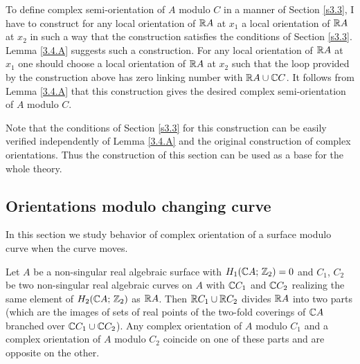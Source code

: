 \documentclass{article}
\numberwithin{equation}{section}
\begin{document}
To define complex semi-orientation of $A$ modulo $C$ in a manner of
Section \ref{s3.3}, I have to construct for any local orientation of $\mathbb R A$ at
$x_1$ a local orientation of $\mathbb R A$ at $x_2$ in such a way that the
construction satisfies the conditions of Section \ref{s3.3}. Lemma
\ref{3.4.A}
suggests such a construction. For any local orientation of $\mathbb R A$ at
$x_1$ one should choose  a local orientation of $\mathbb R A$ at $x_2$ such
that the loop provided by the construction above has zero linking
number with $\mathbb R A\cup\mathbb C C$. It follows from Lemma \ref{3.4.A} that this
construction gives the desired complex semi-orientation of $A$ modulo
$C$.

Note that the conditions of Section \ref{s3.3} for this construction can be
easily verified independently of Lemma \ref{3.4.A} and the original
construction of complex orientations. Thus the construction of this
section can be used as a base for the whole theory.

\subsection{Orientations modulo changing curve}\label{s3.5} 
In this section we
study behavior of complex orientation of a surface modulo curve when
the curve moves.

\begin{thm}\label{3.5.A} Let $A$ be a non-singular real algebraic surface with
$H_1(\mathbb C A;\,\mathbb Z_2)=0$ and $C_1$, $C_2$ be two non-singular real
algebraic curves on $A$ with $\mathbb C C_1$ and $\mathbb C C_2$ realizing the same
element of $H_2(\mathbb C A;\,\mathbb Z_2)$ as $\mathbb R A$. Then $\mathbb R C_1\cup\mathbb R C_2$ divides
$\mathbb R A$ into two parts (which are the images of sets of real points of
the two-fold coverings of $\mathbb C A$ branched over $\mathbb C C_1\cup\mathbb C C_2$).
Any complex orientation of $A$ modulo $C_1$ and a complex orientation
of $A$ modulo $C_2$ coincide on one of these parts and are opposite on
the other. \end{thm}
\end{document}
